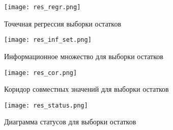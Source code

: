 \documentclass[12pt,a4paper]{article}
\begin{document}
                \begin{figure}[h!]
                    \centering
                    \texttt{[image: res\_regr.png]}
                    \caption{Точечная регрессия выборки остатков}
                \end{figure}
                \FloatBarrier
                
                \begin{figure}[h!]
                    \centering
                    \texttt{[image: res\_inf\_set.png]}
                    \caption{Информационное множество для выборки остатков}
                \end{figure}
                \FloatBarrier
                
                \begin{figure}[h!]
                    \centering
                    \texttt{[image: res\_cor.png]}
                    \caption{Коридор совместных значений для выборки остатков}
                \end{figure}
                \FloatBarrier

                \begin{figure}[h!]
                    \centering
                    \texttt{[image: res\_status.png]}
                    \caption{Диаграмма статусов для выборки остатков}
                \end{figure}
                \FloatBarrier
\end{document}

